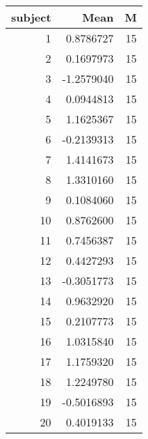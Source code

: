 \begin{table}[ht]
\centering
\begin{tabular}{rrr}
  \hline
subject & Mean & M \\ 
  \hline
       1 & 0.8786727 &       15 \\ 
         2 & 0.1697973 &       15 \\ 
         3 & -1.2579040 &       15 \\ 
         4 & 0.0944813 &       15 \\ 
         5 & 1.1625367 &       15 \\ 
         6 & -0.2139313 &       15 \\ 
         7 & 1.4141673 &       15 \\ 
         8 & 1.3310160 &       15 \\ 
         9 & 0.1084060 &       15 \\ 
        10 & 0.8762600 &       15 \\ 
        11 & 0.7456387 &       15 \\ 
        12 & 0.4427293 &       15 \\ 
        13 & -0.3051773 &       15 \\ 
        14 & 0.9632920 &       15 \\ 
        15 & 0.2107773 &       15 \\ 
        16 & 1.0315840 &       15 \\ 
        17 & 1.1759320 &       15 \\ 
        18 & 1.2249780 &       15 \\ 
        19 & -0.5016893 &       15 \\ 
        20 & 0.4019133 &       15 \\ 
   \hline
\end{tabular}
\end{table}
